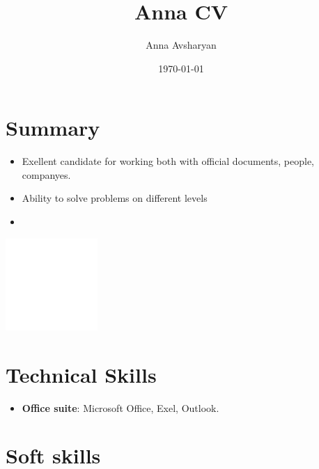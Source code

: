 \documentclass{article}
\title{ Anna CV}
\author{Anna Avsharyan}
\date{\today}
\begin{document}
 
\makecvtitle %

\section{Summary}

\begin{minipage}{0.7\textwidth}
   \begin{itemize}
      \item Exellent candidate for working both with official documents, people, companyes.
      \item Ability to solve problems on different levels
      \item 
      \end{itemize}
   \end{minipage}%
   \hfill
   \begin{minipage}{0.3\textwidth}
      \includegraphics[width=3.5cm,right]{picture.jpg}
\end{minipage}%





\section{Technical Skills}

\begin{itemize}
\item \textbf{Office suite}: Microsoft Office, Exel, Outlook.
\end{itemize}
 
\section{Soft skills}
\end{document}

